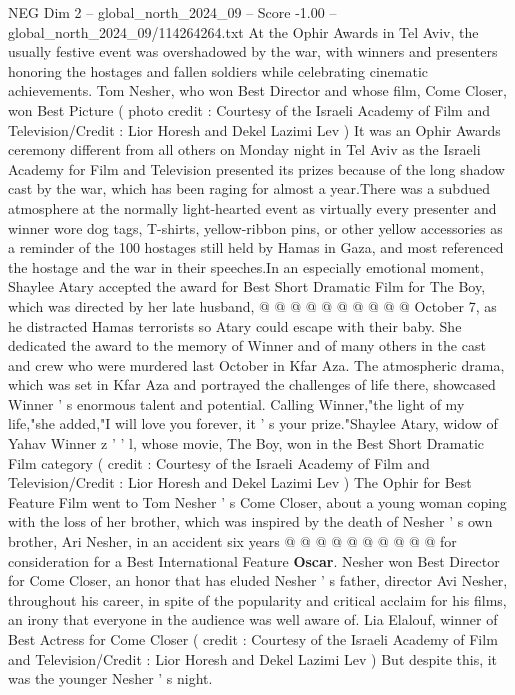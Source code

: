 \begin{textsample}{NEG Dim 2 – global\_north\_2024\_09 – Score -1.00 – global\_north\_2024\_09/114264264.txt}  \label{ex:f2_neg_314}
At the Ophir Awards in Tel Aviv, the usually festive event was overshadowed by the war, with winners and presenters honoring the hostages and fallen soldiers while celebrating cinematic achievements.
Tom Nesher, who won Best Director and whose film, Come Closer, won Best Picture ( photo credit : Courtesy of the Israeli Academy of Film and Television/Credit : Lior Horesh and Dekel Lazimi Lev ) It was an Ophir Awards ceremony different from all others on Monday night in Tel Aviv as the Israeli Academy for Film and Television presented its prizes because of the long shadow cast by the war, which has been raging for almost a year.There was a subdued atmosphere at the normally light-hearted event as virtually every presenter and winner wore dog tags, T-shirts, yellow-ribbon pins, or other yellow accessories as a reminder of the 100 hostages still held by Hamas in Gaza, and most referenced the hostage and the war in their speeches.In an especially emotional moment, Shaylee Atary accepted the award for Best Short Dramatic Film for The Boy, which was directed by her late husband, @ @ @ @ @ @ @ @ @ @ October 7, as he distracted Hamas terrorists so Atary could escape with their baby.
She dedicated the award to the memory of Winner and of many others in the cast and crew who were murdered last October in Kfar Aza.
The atmospheric drama, which was set in Kfar Aza and portrayed the challenges of life there, showcased Winner ' s enormous talent and potential.
Calling Winner,"the light of my life,"she added,"I will love you forever, it ' s your prize."Shaylee Atary, widow of Yahav Winner z ' ' l, whose movie, The Boy, won in the Best Short Dramatic Film category ( credit : Courtesy of the Israeli Academy of Film and Television/Credit : Lior Horesh and Dekel Lazimi Lev ) The Ophir for Best Feature Film went to Tom Nesher ' s Come Closer, about a young woman coping with the loss of her brother, which was inspired by the death of Nesher ' s own brother, Ari Nesher, in an accident six years @ @ @ @ @ @ @ @ @ @ for consideration for a Best International Feature \textbf{Oscar}.
Nesher won Best Director for Come Closer, an honor that has eluded Nesher ' s father, director Avi Nesher, throughout his career, in spite of the popularity and critical acclaim for his films, an irony that everyone in the audience was well aware of.
Lia Elalouf, winner of Best Actress for Come Closer ( credit : Courtesy of the Israeli Academy of Film and Television/Credit : Lior Horesh and Dekel Lazimi Lev ) But despite this, it was the younger Nesher ' s night.

\end{textsample}
